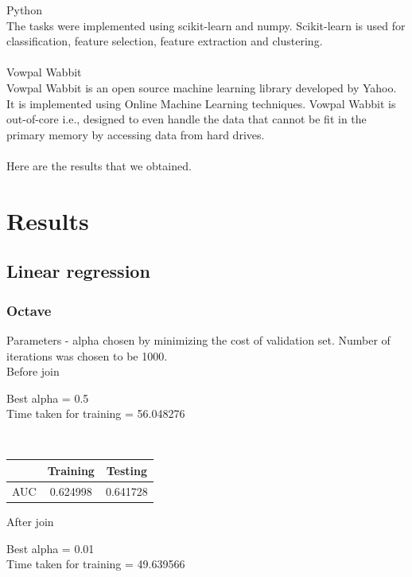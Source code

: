 \documentclass[10pt]{article}
\begin{document}
Python\\
The tasks were implemented using scikit-learn and numpy. Scikit-learn is used for classification, feature selection, feature extraction and clustering.\\\\

Vowpal Wabbit\\
Vowpal Wabbit is an open source machine learning library developed by Yahoo. It is implemented using Online Machine Learning techniques. Vowpal Wabbit is out-of-core i.e., designed to even handle the data that cannot be fit in the primary memory by accessing data from hard drives.\\\\

Here are the results that we obtained.

\section{Results}
\subsection{Linear regression}

\subsubsection{Octave}
Parameters - alpha chosen by minimizing the cost of validation set. Number of iterations was chosen to be 1000.
\\

Before join

	Best alpha = 0.5 
\\

	Time taken for training = 56.048276

\\
\begin{center}
 \begin{tabular}{|c | c | c ||} 
 \hline
 & Training & Testing\\ [0.5ex] 
 \hline\hline
AUC & 0.624998 & 0.641728\\
 \hline
\end{tabular}
\end{center}

After join

	Best alpha = 0.01 
\\

	Time taken for training = 49.639566
\end{document}
